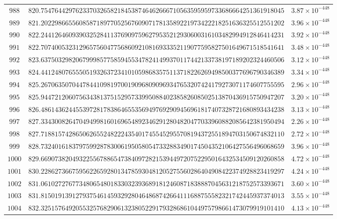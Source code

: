 \documentclass[12pt,reqno]{amsart}
\theoremstyle{remark}
\begin{document}
\begin{longtable}{clc}
$988$ & $820.7547644297623370326582184538746462666710563595959733686664251361918045$ & $3.87\times 10^{-448}$ \\
$989$ & $821.2022986655608587189770525676090717813589221973422218251636325512551202$ & $3.96\times 10^{-448}$ \\
$990$ & $822.2441264609390325284113769097596279535212930600316103482994912846414231$ & $3.92\times 10^{-448}$ \\
$991$ & $822.7074005323129657560477568609210816933352119077595827501649671518541641$ & $3.48\times 10^{-448}$ \\
$992$ & $823.6375032982067999857758594553478241499370117442133738197189202324460506$ & $3.12\times 10^{-448}$ \\
$993$ & $824.4412480765550519326372341010598683575113718226269498500377696790346389$ & $3.34\times 10^{-448}$ \\
$994$ & $825.2670635070447844109819700190968090969347653207424179273071174607755595$ & $2.96\times 10^{-448}$ \\
$995$ & $825.9447212060756343813751529573399508840238582608502513870436915750947207$ & $3.20\times 10^{-448}$ \\
$996$ & $826.4861436244553972817838646553569497692909456961817407328721680893434238$ & $3.13\times 10^{-448}$ \\
$997$ & $827.3343008264704949981601696548923462912804820477033960882085642381950494$ & $2.26\times 10^{-448}$ \\
$998$ & $827.7188157428650626552482224354017455452955708194372551894703150674832110$ & $2.72\times 10^{-448}$ \\
$999$ & $828.7324016183797599287830061950580547332883490174504352106427556496068659$ & $3.96\times 10^{-448}$ \\
$1000$ & $829.6690738204932255678865473840972821539449720752295016432534509120260858$ & $4.72\times 10^{-448}$ \\
$1001$ & $830.2286273667595622659280134785930481205275560286404908422374928823419297$ & $4.24\times 10^{-448}$ \\
$1002$ & $831.0610272767734806548018330323936891812460871838887045631218752573393671$ & $3.60\times 10^{-448}$ \\
$1003$ & $831.8150191391279375461459329280464868742664111688755582321742445937374013$ & $3.55\times 10^{-448}$ \\
$1004$ & $832.3251576492055325768290613238052291793286861044975798661473079919101410$ & $4.13\times 10^{-448}$ \\

\end{longtable}
\end{document}
